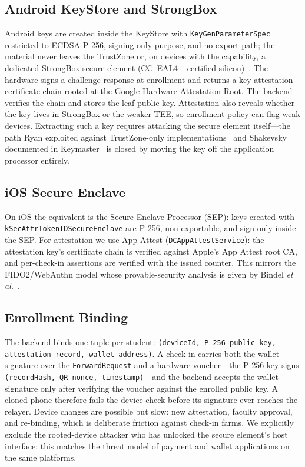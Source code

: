 \documentclass[conference]{IEEEtran}
\begin{document}
\subsection{Android KeyStore and StrongBox}
Android keys are created inside the KeyStore with
\texttt{KeyGenParameterSpec} restricted to ECDSA P-256, signing-only purpose,
and no export path; the material never leaves the TrustZone or, on devices
with the capability, a dedicated StrongBox secure element
(CC~EAL4+-certified silicon)~\cite{Pinto2019Demystifying}. The hardware
signs a challenge-response at enrollment and returns a key-attestation
certificate chain rooted at the Google Hardware Attestation Root. The backend
verifies the chain and stores the leaf public key. Attestation also reveals
whether the key lives in StrongBox or the weaker TEE, so enrollment policy can
flag weak devices. Extracting such a key requires attacking the secure element
itself---the path Ryan exploited against TrustZone-only
implementations~\cite{Ryan2019HardwareBacked} and Shakevsky documented in
Keymaster~\cite{Shakevsky2022TrustDies} is closed by moving the key off the
application processor entirely.

\subsection{iOS Secure Enclave}
On iOS the equivalent is the Secure Enclave Processor (SEP): keys created with
\texttt{kSecAttrTokenIDSecureEnclave} are P-256, non-exportable, and sign only
inside the SEP. For attestation we use App Attest
(\texttt{DCAppAttestService}): the attestation key's certificate chain is
verified against Apple's App Attest root CA, and per-check-in assertions are
verified with the issued counter. This mirrors the FIDO2/WebAuthn model whose
provable-security analysis is given by Bindel \emph{et al.}~\cite{Bindel2023FIDO2}.

\subsection{Enrollment Binding}
The backend binds one tuple per student: \texttt{(deviceId, P-256 public key,
attestation record, wallet address)}. A check-in carries both the wallet
signature over the \texttt{ForwardRequest} and a hardware voucher---the
P-256 key signs \texttt{(recordHash, QR nonce, timestamp)}---and the backend
accepts the wallet signature only after verifying the voucher against the
enrolled public key. A cloned phone therefore fails the device check before
its signature ever reaches the relayer. Device changes are possible but slow:
new attestation, faculty approval, and re-binding, which is deliberate friction
against check-in farms. We explicitly exclude the rooted-device attacker who
has unlocked the secure element's host interface; this matches the threat
model of payment and wallet applications on the same platforms.
\end{document}

